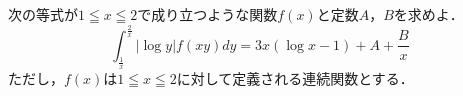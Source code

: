 \documentclass[../../main.tex]{subfiles}
\begin{document}
次の等式が$1\leqq x \leqq2$で成り立つような関数$f(x)$と定数$A$，$B$を求めよ．
\[ \int_\frac{1}{x}^\frac{2}{x}|\log y|f(xy)dy=3x(\log x-1)+A+\frac{B}{x} \]
ただし，$f(x)$は$1\leqq x \leqq2$に対して定義される連続関数とする．
\end{document}
